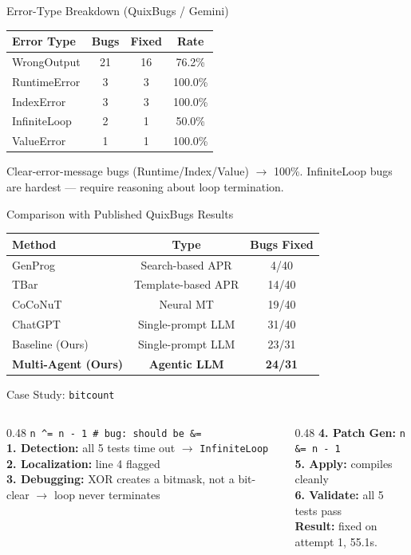 \documentclass[aspectratio=169]{beamer}
\begin{document}
\begin{frame}{Error-Type Breakdown (QuixBugs / Gemini)}
\begin{table}
\centering
\begin{tabular}{lccc}
\toprule
\textbf{Error Type} & \textbf{Bugs} & \textbf{Fixed} & \textbf{Rate} \\
\midrule
WrongOutput & 21 & 16 & 76.2\% \\
RuntimeError & 3 & 3 & 100.0\% \\
IndexError & 3 & 3 & 100.0\% \\
InfiniteLoop & 2 & 1 & 50.0\% \\
ValueError & 1 & 1 & 100.0\% \\
\bottomrule
\end{tabular}
\end{table}
Clear-error-message bugs (Runtime/Index/Value) $\to$ 100\%. InfiniteLoop bugs are hardest --- require reasoning about loop termination.
\end{frame}

\begin{frame}{Comparison with Published QuixBugs Results}
\begin{table}
\centering
\small
\begin{tabular}{lcc}
\toprule
\textbf{Method} & \textbf{Type} & \textbf{Bugs Fixed} \\
\midrule
GenProg & Search-based APR & 4/40 \\
TBar & Template-based APR & 14/40 \\
CoCoNuT & Neural MT & 19/40 \\
ChatGPT & Single-prompt LLM & 31/40 \\
Baseline (Ours) & Single-prompt LLM & 23/31 \\
\textbf{Multi-Agent (Ours)} & \textbf{Agentic LLM} & \textbf{24/31} \\
\bottomrule
\end{tabular}
\end{table}
\end{frame}

\begin{frame}{Case Study: \texttt{bitcount}}
\begin{columns}
\begin{column}{0.48\textwidth}
\small
\texttt{n \^{}= n - 1  \# bug: should be \&=}\\[4pt]
\textbf{1. Detection:} all 5 tests time out $\to$ \texttt{InfiniteLoop}\\
\textbf{2. Localization:} line 4 flagged\\
\textbf{3. Debugging:} XOR creates a bitmask, not a bit-clear $\to$ loop never terminates
\end{column}
\begin{column}{0.48\textwidth}
\small
\textbf{4. Patch Gen:} \texttt{n \&= n - 1}\\
\textbf{5. Apply:} compiles cleanly\\
\textbf{6. Validate:} all 5 tests pass\\[4pt]
\textbf{Result:} fixed on attempt 1, 55.1s.
\end{column}
\end{columns}
\end{frame}
\end{document}
